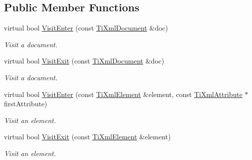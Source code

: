 \subsection*{Public Member Functions}
\begin{DoxyCompactItemize}
\item 
\mbox{\label{classTiXmlPrinter_a2ec73087db26ff4d2c4316c56f861db7}} 
virtual bool \hyperlink{classTiXmlPrinter_a2ec73087db26ff4d2c4316c56f861db7}{Visit\+Enter} (const \hyperlink{classTiXmlDocument}{Ti\+Xml\+Document} \&doc)
\begin{DoxyCompactList}\small\item\em Visit a document. \end{DoxyCompactList}\item 
\mbox{\label{classTiXmlPrinter_a0a636046fa589b6d7f3e5bd025b3f33e}} 
virtual bool \hyperlink{classTiXmlPrinter_a0a636046fa589b6d7f3e5bd025b3f33e}{Visit\+Exit} (const \hyperlink{classTiXmlDocument}{Ti\+Xml\+Document} \&doc)
\begin{DoxyCompactList}\small\item\em Visit a document. \end{DoxyCompactList}\item 
\mbox{\label{classTiXmlPrinter_a6dccaf5ee4979f13877690afe28721e8}} 
virtual bool \hyperlink{classTiXmlPrinter_a6dccaf5ee4979f13877690afe28721e8}{Visit\+Enter} (const \hyperlink{classTiXmlElement}{Ti\+Xml\+Element} \&element, const \hyperlink{classTiXmlAttribute}{Ti\+Xml\+Attribute} $\ast$first\+Attribute)
\begin{DoxyCompactList}\small\item\em Visit an element. \end{DoxyCompactList}\item 
\mbox{\label{classTiXmlPrinter_ae6a1df8271df4bf62d7873c38e34aa69}} 
virtual bool \hyperlink{classTiXmlPrinter_ae6a1df8271df4bf62d7873c38e34aa69}{Visit\+Exit} (const \hyperlink{classTiXmlElement}{Ti\+Xml\+Element} \&element)
\begin{DoxyCompactList}\small\item\em Visit an element. \end{DoxyCompactList}\item 
\mbox{\label{classTiXmlPrinter_adaf7eec4dc43ad071ff52b60361574f5}} 

\end{DoxyCompactItemize}
